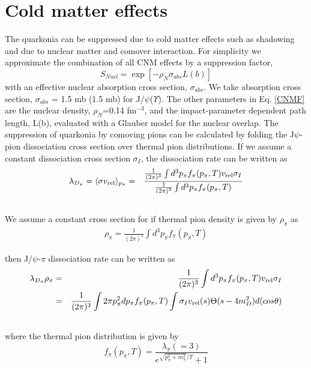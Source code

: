 \documentclass[aps,prc,preprint,superscriptaddress,showpacs,showkeys]{revtex4-1}
\begin{document}
\section{Cold matter effects}
The quarkonia can be suppressed due to cold matter effects such as shadowing and due to nuclear
matter and comover interaction. For simplicity we approximate the combination of all CNM effects 
by a suppression factor,
\begin{equation}
  S_{Nucl}=\exp[-\rho_{N}\sigma_{abs}L(b)]
  \label{CNMF}
\end{equation}
with an effective nuclear absorption cross section, $\sigma_{abs}$.
We take absorption cross section, $\sigma_{abs}$ = 1.5 mb (1.5 mb) for
J/$\psi$($\Upsilon$). The other parameters in Eq. \ref{CNMF} are the nuclear density,
$\rho_N$=0.14 fm$^{-3}$, and the impact-parameter dependent path length, L(b), evaluated 
with a Glauber model \cite{GM_PShukla} for the nuclear overlap.
The suppression of quarkonia by comoving pions can be calculated by folding the J$\psi$-pion
dissociation cross section over thermal pion distributions. If we assume a constant dissociation 
cross section $\sigma_{I}$, the dissociation rate can be written as
\begin{eqnarray}
\lambda_{D_{\pi}} = \langle \sigma v_{\rm rel} \rangle_{p_{\pi}} & = 
& \frac{ \frac{1}{(2\pi)^{3}} \int d^{3}p_{\pi} f_{\pi}(p_{\pi},T) v_{\rm rel} \sigma_{I}}{\frac{1}{(2\pi)^{3}} \int d^{3}p_{\pi} f_{\pi}(p_{\pi},T)} \\ \nonumber
\end{eqnarray}
We assume a constant cross section for 
if thermal pion density is given by $\rho_{\pi}$ as 
\begin{eqnarray}
\rho_\pi =\frac{1}{(2\pi)^{3}} \int d^3p_{\pi} f_{\pi}(p_{\pi},T) 
\end{eqnarray}

then J/$\psi$-$\pi$ dissociation rate can be written as  
\begin{eqnarray}
\lambda_{D_{\pi}}\rho_{\pi} & = & \frac{1}{(2\pi)^{3}} \int d^{3}p_{\pi} f_{\pi}(p_{\pi},T) v_{\rm rel} \sigma_{I}\\ \nonumber
                   & = &\frac{1}{(2\pi)^{3}} \int  2\pi p_{\pi}^{2} dp_{\pi} f_{\pi}(p_{\pi},T) \int \sigma_{I} v_{\rm rel}(s) \Theta(s-4m_{D}^{2}) d(cos\theta) \\\nonumber
\end{eqnarray}
where the thermal pion distribution is given by
\begin{equation}
f_{\pi}(p_{\pi},T)=\frac{\lambda_{\pi}(=3)}{e^{\sqrt{p_{\pi}^{2} + m_{\pi}^{2}}/T}+1} 
\end{equation}
\end{document}
